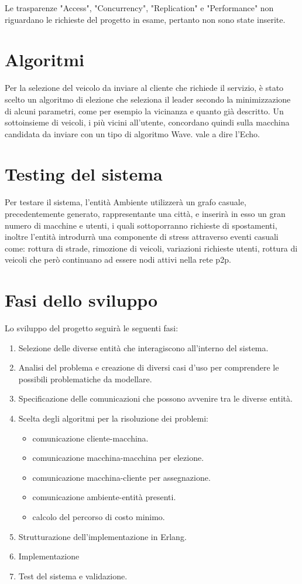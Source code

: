Le trasparenze "Access", "Concurrency", "Replication" e "Performance" non riguardano le richieste del progetto in esame, pertanto non sono state inserite.

\section{Algoritmi} \label{intro_algo}

Per la selezione del veicolo da inviare al cliente che richiede il servizio, è stato scelto un algoritmo di elezione che seleziona il leader secondo la minimizzazione di alcuni parametri, come per esempio la vicinanza e quanto già descritto. Un sottoinsieme di veicoli, i più vicini all'utente, concordano quindi sulla macchina candidata da inviare con un tipo di algoritmo Wave. vale a dire l'Echo.

\section{Testing del sistema}

Per testare il sistema, l'entità Ambiente utilizzerà un grafo casuale, precedentemente generato, rappresentante una città, e inserirà in esso un gran numero di macchine e utenti, i quali sottoporranno richieste di spostamenti, inoltre l'entità introdurrà una componente di stress attraverso eventi casuali come: rottura di strade, rimozione di veicoli, variazioni richieste utenti, rottura di veicoli che però continuano ad essere nodi attivi nella rete p2p. 

\section{Fasi dello sviluppo}
Lo sviluppo del progetto seguirà le seguenti fasi:
\begin{enumerate}
	\item Selezione delle diverse entità che interagiscono all'interno del sistema.
	\item Analisi del problema e creazione di diversi casi d'uso per comprendere le possibili problematiche da modellare.
	\item Specificazione delle comunicazioni che possono avvenire tra le diverse entità.
	\item Scelta degli algoritmi per la risoluzione dei problemi: 
		\begin{itemize}
			\item comunicazione cliente-macchina.
			\item comunicazione macchina-macchina per elezione.
			\item comunicazione macchina-cliente per assegnazione.
			\item comunicazione ambiente-entità presenti.
			\item calcolo del percorso di costo minimo.
		\end{itemize}
	\item Strutturazione dell'implementazione in Erlang.
	\item Implementazione
	\item Test del sistema e validazione.
\end{enumerate}

